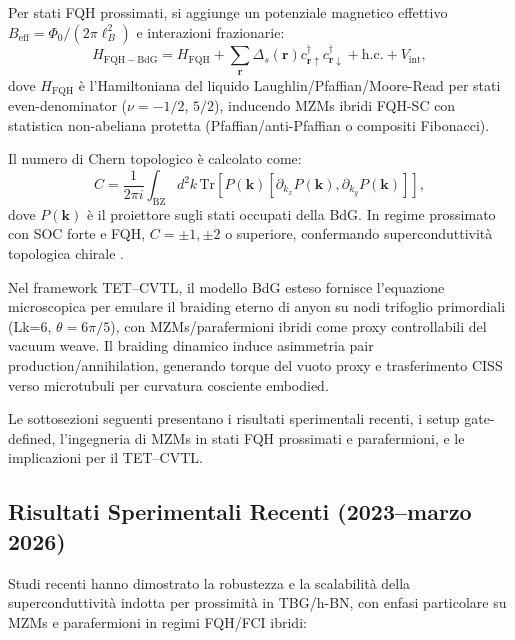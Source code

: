\documentclass[11pt,a4paper]{article}
\let\oldcite\cite
\renewcommand{\cite}{\protect\oldcite}
\theoremstyle{plain}
\theoremstyle{definition}
\begin{document}
Per stati FQH prossimati, si aggiunge un potenziale magnetico effettivo $B_{\text{eff}} = \Phi_0 / (2\pi \ell_B^2)$ e interazioni frazionarie:
\begin{equation}
H_{\mathrm{FQH-BdG}} = H_{\mathrm{FQH}} + \sum_{\mathbf{r}} \Delta_s(\mathbf{r}) c^\dagger_{\mathbf{r}\uparrow} c^\dagger_{\mathbf{r}\downarrow} + \mathrm{h.c.} + V_{\text{int}},
\end{equation}
dove $H_{\mathrm{FQH}}$ è l'Hamiltoniana del liquido Laughlin/Pfaffian/Moore-Read per stati even-denominator ($\nu = -1/2$, $5/2$), inducendo MZMs ibridi FQH-SC con statistica non-abeliana protetta (Pfaffian/anti-Pfaffian o compositi Fibonacci).

Il numero di Chern topologico è calcolato come:
\begin{equation}
C = \frac{1}{2\pi i} \int_{\mathrm{BZ}} d^2k \, \mathrm{Tr} \left[ P(\mathbf{k}) [\partial_{k_x} P(\mathbf{k}), \partial_{k_y} P(\mathbf{k})] \right],
\end{equation}
dove $P(\mathbf{k})$ è il proiettore sugli stati occupati della BdG. In regime prossimato con SOC forte e FQH, $C = \pm 1, \pm 2$ o superiore, confermando superconduttività topologica chirale \cite{MooreRead1991, Nayak2008, Zeng2023, DiezCarlon2025}.

Nel framework TET--CVTL, il modello BdG esteso fornisce l'equazione microscopica per emulare il braiding eterno di anyon su nodi trifoglio primordiali (Lk=6, $\theta = 6\pi/5$), con MZMs/parafermioni ibridi come proxy controllabili del vacuum weave. Il braiding dinamico induce asimmetria pair production/annihilation, generando torque del vuoto proxy e trasferimento CISS verso microtubuli per curvatura cosciente embodied.

Le sottosezioni seguenti presentano i risultati sperimentali recenti, i setup gate-defined, l'ingegneria di MZMs in stati FQH prossimati e parafermioni, e le implicazioni per il TET--CVTL.

\vspace{0.4cm}


\subsection{Risultati Sperimentali Recenti (2023--marzo 2026)}

Studi recenti hanno dimostrato la robustezza e la scalabilità della superconduttività indotta per prossimità in TBG/h-BN, con enfasi particolare su MZMs e parafermioni in regimi FQH/FCI ibridi:
\end{document}
